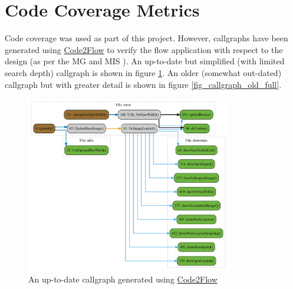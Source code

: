 \documentclass[12pt, titlepage]{article}
\begin{document}
\section{Code Coverage Metrics}
Code coverage was used as part of this project. However, callgraphs have been generated using
\href{https://github.com/scottrogowski/code2flow}{Code2Flow}
to verify the flow application with respect to the design (as per the MG \cite{MG} and MIS \cite{MIS}).
An up-to-date but simplified (with limited search depth) callgraph is shown in figure \ref{fig_callgraph_simple}.
An older (somewhat out-dated) callgraph but with greater detail is shown in figure \ref{fig_callgraph_old_full}.

\begin{figure}[h!]
  \begin{center}
   \includegraphics[width=0.8\textwidth]{callgraph/simple.png}
  \caption{An up-to-date callgraph generated using \href{https://github.com/scottrogowski/code2flow}{Code2Flow}}
  \label{fig_callgraph_simple} 
  \end{center}
\end{figure}
\end{document}
